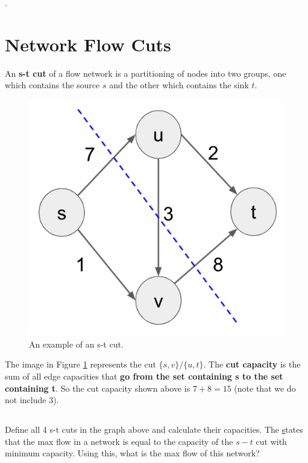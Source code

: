 \documentclass [12pt]{article}
\begin{document}
.


\pagebreak
\section{Network Flow Cuts }

An \textbf{s-t cut} of a flow network is a partitioning of nodes into two groups, one which contains the source $s$ and the other which contains the sink $t$. 

\begin{figure}[h!]
\centering
\includegraphics[scale=0.5]{cut-example.png}
\caption{An example of an s-t cut.}
\label{fig:cut_example}
\end{figure}


The image in Figure \ref{fig:cut_example} represents the cut $\{s, v\} / \{u, t\}$. The \textbf{cut capacity} is the sum of all edge capacities that \textbf{go from the set containing s to the set containing t}. So the cut capacity shown above is $7 + 8 = 15$ (note that we do not include $3$).

\subsection{}

Define all 4 s-t cuts in the graph above and calculate their capacities. The \href{https://en.wikipedia.org/wiki/Max-flow_min-cut_theorem} states that the max flow in a network is equal to the capacity of the $s-t$ cut with minimum capacity. Using this, what is the max flow of this network?
\end{document}
